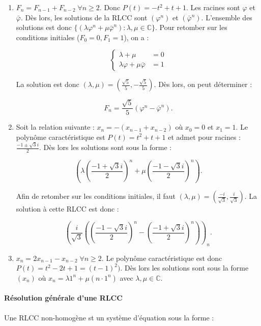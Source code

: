 \documentclass{article}
\begin{document}
			\begin{enumerate}
				\item $F_n = F_{n-1} + F_{n-2} \; \forall n \geq 2$. Donc $P(t) = -t^2 + t + 1$. Les racines sont $\varphi$ et $\bar\varphi$. Dès lors, les solutions de la RLCC sont
					  $(\varphi^n)$ et $(\bar\varphi^n)$. L'ensemble des solutions est donc $\{(\lambda \varphi^n + \mu\bar\varphi^n) : \lambda, \mu \in \mathbb C\}$.
					  Pour retomber sur les conditions initiales ($F_0 = 0, F_1 = 1$), on a :

					  \[\left\{\begin{aligned}\lambda+\mu &= 0\\\lambda \varphi + \mu\bar\varphi &= 1\end{aligned}\right.\]

					  La solution est donc $(\lambda, \mu) = (\frac {\sqrt 5}5, -\frac {\sqrt 5}5)$. Dès lors, on peut déterminer :

					  \[F_n = \frac {\sqrt 5}5(\varphi^n-\bar\varphi^n).\]
				\item Soit la relation suivante : $x_n = -(x_{n-1} + x_{n-2})$ où $x_0 = 0$ et $x_1 = 1$. Le polynôme caractéristique est $P(t) = t^2 + t + 1 $ et admet pour racines :
					  $\frac {-1 \pm \sqrt 3i}2$. Dès lors les solutions sont sous la forme :

					  \[\left(\lambda \left(\frac {-1+\sqrt 3i}2\right)^n + \mu \left(\frac {-1-\sqrt 3i}2\right)^n\right).\]

					  Afin de retomber sur les conditions initiales, il faut $(\lambda, \mu) = \left(\frac {-i}{\sqrt 3}, \frac i{\sqrt 3}\right)$. La solution à cette RLCC est donc :

					  \[\left(\frac i{\sqrt 3}\left(\left(\frac {-1-\sqrt 3i}2\right)^n - \left(\frac {-1+\sqrt 3i}2\right)^n\right)\right)_n.\]

				\item $x_n = 2x_{n-1} - x_{n-2} \; \forall n \geq 2$. Le polynôme caractéristique est donc $P(t) = t^2 - 2t + 1 = (t-1)^2)$. Dès lors les solutions sont sous la forme
					  $(x_n)$ où $x_n = \lambda 1^n + \mu(n \cdot 1^n)$ avec $\lambda, \mu \in \mathbb C$.
			\end{enumerate}

			\paragraph{Résolution générale d'une RLCC} Une RLCC non-homogène st un système d'équation sous la forme :
			
\end{document}
